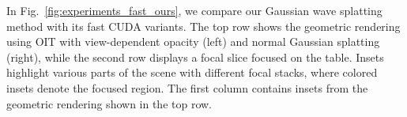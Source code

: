 In Fig.~\ref{fig:experiments_fast_ours}, we compare our Gaussian wave splatting method with its fast CUDA variants. The top row shows the geometric rendering using OIT with view-dependent opacity (left) and normal Gaussian splatting (right), while the second row displays a focal slice focused on the table. Insets highlight various parts of the scene with different focal stacks, where colored insets denote the focused region. The first column contains insets from the geometric rendering shown in the top row. 
\fi